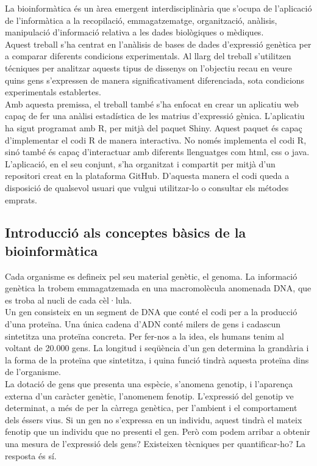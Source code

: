 \documentclass[english]{article}
\begin{document}
La bioinformàtica és un àrea emergent interdisciplinària que s'ocupa de l'aplicació de l'informàtica a la recopilació, emmagatzematge, organització, anàlisis, manipulació d'informació relativa a les dades biològiques o mèdiques.
\\

Aquest treball s'ha centrat en l'anàlisis de bases de dades d'expressió genètica per a comparar diferents condicions experimentals. Al llarg del treball s'utilitzen técniques per analitzar aquests tipus de dissenys on l'objectiu recau en veure quins gens s'expressen de manera significativament diferenciada, sota condicions experimentals establertes.
\\

Amb aquesta premissa, el treball també s'ha enfocat en crear un aplicatiu web capaç de fer una anàlisi estadística de les matrius d'expressió gènica. L'aplicatiu ha sigut programat amb R, per mitjà del paquet Shiny. Aquest paquet és capa\c{c} d'implementar el codi R de manera interactiva. No només implementa el codi R, sinó també és capaç d'interactuar amb diferents llenguatges com html, css o java. L'aplicació, en el seu conjunt, s'ha organitzat i compartit per mitjà d'un repositori creat en la plataforma GitHub. D'aquesta manera el codi queda a disposició de qualsevol usuari que vulgui utilitzar-lo o consultar els métodes emprats.

\subsection{Introducció als conceptes bàsics de la bioinformàtica}

Cada organisme es defineix pel seu material genètic, el genoma. La informació genètica la trobem emmagatzemada en una macromolècula anomenada DNA, que es troba al nucli de cada cèl·lula.
\\

Un gen consisteix en un segment de DNA que conté el codi per a la producció d'una proteïna. Una única cadena d'ADN conté milers de gens i cadascun sintetitza una proteïna concreta. Per fer-nos a la idea, els humans tenim al voltant de 20.000 gens. La longitud i seqüència d'un gen determina la grandària i la forma de la proteïna que sintetitza, i quina funció tindrà aquesta proteïna dins de l'organisme.
\\

La dotació de gens que presenta una espècie, s'anomena genotip, i l'aparen\c{c}a externa d'un caràcter genètic, l'anomenem fenotip. L'expressió del genotip ve determinat, a més de per la càrrega genètica, per l'ambient i el comportament dels éssers vius. Si un gen no s'expressa en un individu, aquest tindrà el mateix fenotip que un individu que no presenti el gen. Però com podem arribar a obtenir una mesura de l'expressió dels gens? Existeixen tècniques per quantificar-ho? La resposta és sí.
\\
\end{document}
